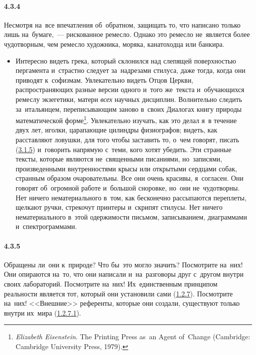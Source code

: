 \paragraph{4.3.4}\hypertarget{par:4.3.4}{} Несмотря на~все впечатления об~обратном, защищать то, что написано только лишь на~бумаге,~--- рискованное ремесло. Однако это ремесло не~является более чудотворным, чем ремесло художника, моряка, канатоходца или банкира.
	\begin{itemize}
	\item 
	Интересно видеть грека, который склонился над слепящей поверхностью пергамента и~страстно следует за~надрезами стилуса, даже тогда, когда они приводят к~софизмам. Увлекательно видеть Отцов Церкви, распространяющих разные версии одного и~того же~текста и~обучающихся ремеслу экзегетики, матери {\itshape всех} научных дисциплин. Волнительно следить за~итальянцем, переписывающим заново в~своих Диалогах книгу природы математической форме\footnote{{\itshape Elizabeth Eisenstein}. The Printing Press as~an Agent of~Change (Cam­bridge: Cambridge University Press, 1979).}. Увлекательно изучать, как это делал я~в течение двух лет, иголки, царапающие цилиндры физиографов; видеть, как расставляют ловушки, для того чтобы заставить то, о~чем говорят, писать (\hyperlink{par:3.1.5}{3.1.5}) и~говорить напрямую с~теми, кого хотят убедить. Эти странные тексты, которые являются не~священными писаниями, но~записями, произведенными внутренностями крысы или открытыми сердцами собак, странным образом очаровательны. Все они очень красивы, я~согласен. Они говорят об~огромной работе и~большой сноровке, но~они не~чудотворны. Нет ничего нематериального в~том, как бесконечно рассыпаются переплеты, щелкают ручки, стрекочут принтеры и~скрипят стилусы. Нет ничего нематериального в~этой одержимости письмом, записыванием, диаграммами и~спектрограммами.
	\end{itemize}	

\paragraph{4.3.5}\hypertarget{par:4.3.5}{} Обращены ли~они к~природе? Что бы~это могло значить? Посмотрите на~них! Они опираются на~то, что они написали и~на~разговоры друг с~другом внутри своих лабораторий. Посмотрите на~них! Их~единственным принципом реальности является тот, который они установили сами (\hyperlink{par:1.2.7}{1.2.7}). Посмотрите на~них! <<Внешние>> референты, которые они создали, существуют только внутри их~мира (\hyperlink{par:1.2.7.1}{1.2.7.1}).


